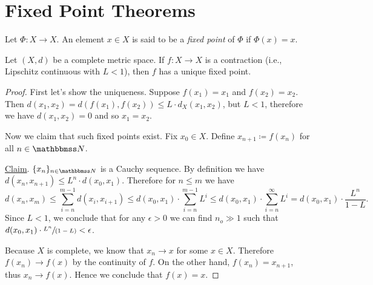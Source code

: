 \documentclass[screen,single]{techreport}
\numberwithin{equation}{section}
\begin{document}
\section{Fixed Point Theorems}

\begin{definition}\label{De:FixedPoint}
  Let $\Phi : X \to X$.
  An element $x \in X$ is said to be a \emph{fixed point} of $\Phi$ if $\Phi(x) = x$.
\end{definition}

\begin{theorem}\label{The:BanachConstrPrinc}
  Let $(X,d)$ be a complete metric space.
  If $f : X \to X$ is a contraction (i.e., Lipschitz continuous with $L<1$), then $f$ has a unique fixed point.
\end{theorem}
\begin{proof}
  First let's show the uniqueness.
  Suppose $f(x_1) = x_1$ and $f(x_2) = x_2$.
  Then $d(x_1,x_2) = d(f(x_1),f(x_2)) \le L \cdot d_X(x_1,x_2)$, but $L < 1$, therefore we have $d(x_1,x_2) = 0$ and so $x_1 = x_2$.
  
  Now we claim that such fixed points exist.
  Fix $x_0 \in X$. Define $x_{n+1} \coloneqq f(x_n)$ for all $n \in \bbN$.
  
  \underline{Claim}. $\{x_n\}_{n \in \bbN}$ is a Cauchy sequence.
  By definition we have $d(x_n,x_{n+1}) \le L^n \cdot d(x_0,x_1)$.
  Therefore for $n \le m$ we have
  \[
  d(x_n,x_m) \le \sum_{i=n}^{m-1} d(x_i,x_{i+1}) \le d(x_0,x_1) \cdot \sum_{i=n}^{m-1} L^{i} \le d(x_0,x_1) \cdot \sum_{i=n}^\infty L^i = d(x_0,x_1) \cdot \frac{L^n}{1 - L}.
  \]
  Since $L < 1$, we conclude that for any $\epsilon > 0$ we can find $n_o \gg 1$ such that $d(x_0,x_1) \cdot\sfrac{L^n}{(1-L)} < \epsilon$.
  
  Because $X$ is complete, we know that $x_n \rightarrow x$ for some $x \in X$.
  Therefore $f(x_n) \rightarrow f(x)$ by the continuity of $f$.
  On the other hand, $f(x_n) = x_{n+1}$, thus $x_n \rightarrow f(x)$.
  Hence we conclude that $f(x) = x$.
\end{proof}
\end{document}
